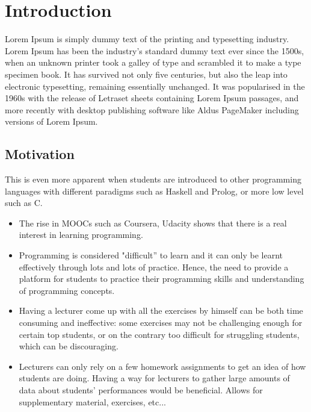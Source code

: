 \documentclass[11pt,a4paper]{report}
\begin{document}
%

\chapter{Introduction}

Lorem Ipsum is simply dummy text of the printing and typesetting industry. Lorem Ipsum has been the industry's standard dummy text ever since the 1500s, when an unknown printer took a galley of type and scrambled it to make a type specimen book. It has survived not only five centuries, but also the leap into electronic typesetting, remaining essentially unchanged. It was popularised in the 1960s with the release of Letraset sheets containing Lorem Ipsum passages, and more recently with desktop publishing software like Aldus PageMaker including versions of Lorem Ipsum.

\section{Motivation}

This is even more apparent when students are introduced to other programming languages with different paradigms such as Haskell and Prolog, or more low level such as C.


\begin{itemize}
\item The rise in MOOCs such as Coursera, Udacity shows that there is a real interest in learning programming.
\item Programming is considered "difficult'' to learn and it can only be learnt effectively through lots and lots of practice. Hence, the need to provide a platform for students to practice their programming skills and understanding of programming concepts.
\item Having a lecturer come up with all the exercises by himself can be both time consuming and ineffective: some exercises may not be challenging enough for certain top students, or on the contrary too difficult for struggling students, which can be discouraging.
\item Lecturers can only rely on a few homework assignments to get an idea of how students are doing. Having a way for lecturers to gather large amounts of data about students' performances would be beneficial. Allows for supplementary material, exercises, etc...
\end{itemize}
\end{document}

